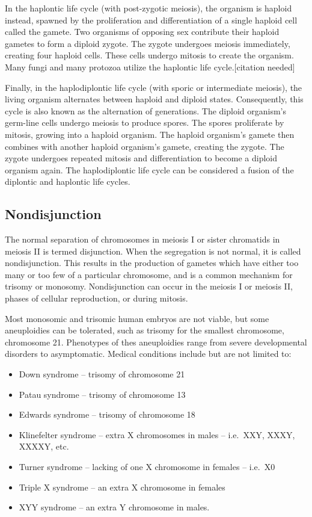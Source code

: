In the haplontic life cycle (with post-zygotic meiosis), the organism is haploid instead, spawned by the proliferation and differentiation of a single haploid cell called the gamete. Two organisms of opposing sex contribute their haploid gametes to form a diploid zygote. The zygote undergoes meiosis immediately, creating four haploid cells. These cells undergo mitosis to create the organism. Many fungi and many protozoa utilize the haplontic life cycle.{[}citation needed{]}

Finally, in the haplodiplontic life cycle (with sporic or intermediate meiosis), the living organism alternates between haploid and diploid states. Consequently, this cycle is also known as the alternation of generations. The diploid organism's germ-line cells undergo meiosis to produce spores. The spores proliferate by mitosis, growing into a haploid organism. The haploid organism's gamete then combines with another haploid organism's gamete, creating the zygote. The zygote undergoes repeated mitosis and differentiation to become a diploid organism again. The haplodiplontic life cycle can be considered a fusion of the diplontic and haplontic life cycles.

\hypertarget{nondisjunction}{%
\subsection{Nondisjunction}\label{nondisjunction}}

The normal separation of chromosomes in meiosis I or sister chromatids in meiosis II is termed disjunction. When the segregation is not normal, it is called nondisjunction. This results in the production of gametes which have either too many or too few of a particular chromosome, and is a common mechanism for trisomy or monosomy. Nondisjunction can occur in the meiosis I or meiosis II, phases of cellular reproduction, or during mitosis.

Most monosomic and trisomic human embryos are not viable, but some aneuploidies can be tolerated, such as trisomy for the smallest chromosome, chromosome 21. Phenotypes of thes aneuploidies range from severe developmental disorders to asymptomatic. Medical conditions include but are not limited to:

\begin{itemize}
\tightlist
\item
  Down syndrome -- trisomy of chromosome 21
\item
  Patau syndrome -- trisomy of chromosome 13
\item
  Edwards syndrome -- trisomy of chromosome 18
\item
  Klinefelter syndrome -- extra X chromosomes in males -- i.e.~XXY, XXXY, XXXXY, etc.
\item
  Turner syndrome -- lacking of one X chromosome in females -- i.e.~X0
\item
  Triple X syndrome -- an extra X chromosome in females
\item
  XYY syndrome -- an extra Y chromosome in males.
\end{itemize}

